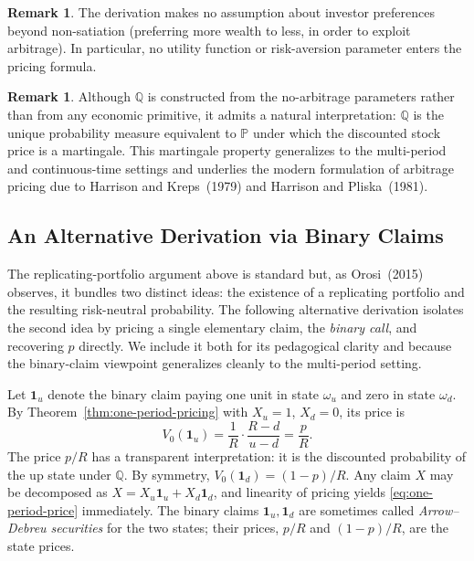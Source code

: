 \documentclass[11pt,a4paper]{article}
\theoremstyle{plain}
\theoremstyle{definition}
\newtheorem{remark}[theorem]{Remark}
\newcommand{\Prob}{\mathbb{P}}
\newcommand{\Q}{\mathbb{Q}}
\begin{document}
\begin{remark}
The derivation makes no assumption about investor preferences beyond
non-satiation (preferring more wealth to less, in order to exploit
arbitrage). In particular, no utility function or risk-aversion parameter
enters the pricing formula.
\end{remark}

\begin{remark}
Although $\Q$ is constructed from the no-arbitrage parameters rather than
from any economic primitive, it admits a natural interpretation: $\Q$ is
the unique probability measure equivalent to $\Prob$ under which the
discounted stock price is a martingale. This martingale property
generalizes to the multi-period and continuous-time settings and underlies
the modern formulation of arbitrage pricing due to Harrison and
Kreps~(1979) and Harrison and Pliska~(1981).
\end{remark}

\subsection{An Alternative Derivation via Binary Claims}
\label{subsec:orosi}

The replicating-portfolio argument above is standard but, as
Orosi~(2015) observes, it bundles two distinct ideas: the existence of a
replicating portfolio and the resulting risk-neutral probability. The
following alternative derivation isolates the second idea by pricing a
single elementary claim, the \emph{binary call}, and recovering $p$
directly. We include it both for its pedagogical clarity and because the
binary-claim viewpoint generalizes cleanly to the multi-period setting.

Let $\mathbf{1}_u$ denote the binary claim paying one unit in state
$\omega_u$ and zero in state $\omega_d$. By
Theorem~\ref{thm:one-period-pricing} with $X_u = 1$, $X_d = 0$, its price is
\begin{equation}
    \label{eq:binary-price}
    V_0(\mathbf{1}_u) = \frac{1}{R} \cdot \frac{R - d}{u - d} = \frac{p}{R}.
\end{equation}
The price $p/R$ has a transparent interpretation: it is the discounted
probability of the up state under $\Q$. By symmetry,
$V_0(\mathbf{1}_d) = (1-p)/R$. Any claim $X$ may be decomposed as
$X = X_u \mathbf{1}_u + X_d \mathbf{1}_d$, and linearity of pricing yields
\eqref{eq:one-period-price} immediately. The binary claims
$\mathbf{1}_u, \mathbf{1}_d$ are sometimes called \emph{Arrow--Debreu
securities} for the two states; their prices, $p/R$ and $(1-p)/R$, are the
state prices.
\end{document}
